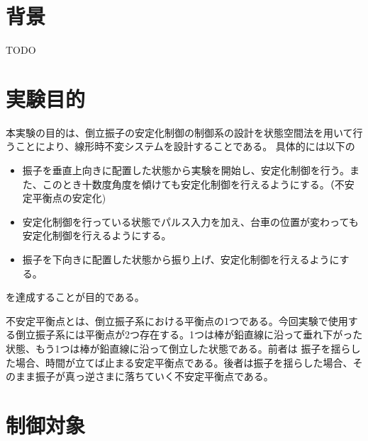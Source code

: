 \section{背景}
TODO
\section{実験目的}
本実験の目的は、倒立振子の安定化制御の制御系の設計を状態空間法を用いて行うことにより、線形時不変システムを設計することである。
具体的には以下の
\begin{itemize}
	\item 振子を垂直上向きに配置した状態から実験を開始し、安定化制御を行う。また、このとき十数度角度を傾けても安定化制御を行えるようにする。（不安定平衡点の安定化)
	\item 安定化制御を行っている状態でパルス入力を加え、台車の位置が変わっても安定化制御を行えるようにする。
	\item 振子を下向きに配置した状態から振り上げ、安定化制御を行えるようにする。
\end{itemize}
を達成することが目的である。\cite{Koga:Binpe}
\par
不安定平衡点とは、倒立振子系における平衡点の1つである。今回実験で使用する倒立振子系には平衡点が2つ存在する。1つは棒が鉛直線に沿って垂れ下がった状態、もう1つは棒が鉛直線に沿って倒立した状態である。前者は
振子を揺らした場合、時間が立てば止まる安定平衡点である。後者は振子を揺らした場合、そのまま振子が真っ逆さまに落ちていく不安定平衡点である。
\newpage

\section{制御対象}
